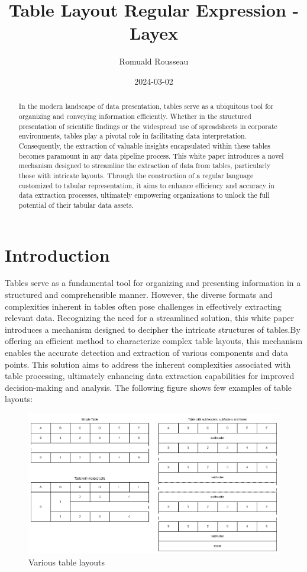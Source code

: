 \documentclass{article}
\title{Table Layout Regular Expression - Layex}
\author{Romuald Rousseau}
\date{ 2024-03-02 }
\begin{document}
\maketitle

\begin{abstract}
In the modern landscape of data presentation, tables serve as a ubiquitous tool for organizing and conveying information
efficiently. Whether in the structured presentation of scientific findings or the widespread use of spreadsheets in
corporate environments, tables play a pivotal role in facilitating data interpretation. Consequently, the extraction of
valuable insights encapsulated within these tables becomes paramount in any data pipeline process. This white paper
introduces a novel mechanism designed to streamline the extraction of data from tables, particularly those with intricate
layouts. Through the construction of a regular language customized to tabular representation, it aims to enhance efficiency
and accuracy in data extraction processes, ultimately empowering organizations to unlock the full potential of their
tabular data assets.
\end{abstract}

\section{Introduction}
Tables serve as a fundamental tool for organizing and presenting information in a structured and comprehensible manner.
However, the diverse formats and complexities inherent in tables often pose challenges in effectively extracting relevant
data. Recognizing the need for a streamlined solution, this white paper introduces a mechanism designed to decipher the
intricate structures of tables.By offering an efficient method to characterize complex table layouts, this mechanism
enables the accurate detection and extraction of various components and data points. This solution aims to address the
inherent complexities associated with table processing, ultimately enhancing data extraction capabilities for improved
decision-making and analysis. The following figure shows few examples of table layouts:
\begin{figure}[H]
\caption{Various table layouts}
\includegraphics[width=\columnwidth]{various_tables.drawio}
\end{figure}
\end{document}
